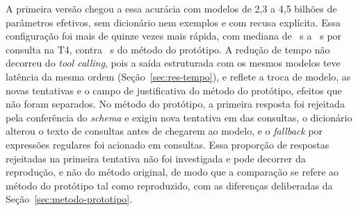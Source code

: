 A primeira versão chegou a essa acurácia com modelos de 2,3 a 4,5 bilhões de parâmetros efetivos, sem dicionário nem exemplos e com recusa explícita. Essa configuração foi mais de quinze vezes mais rápida, com mediana de ~s a ~s por consulta na T4, contra ~s do método do protótipo. A redução de tempo não decorreu do \textit{tool calling}, pois a saída estruturada com os mesmos modelos teve latência da mesma ordem (Seção~\ref{sec:res-tempo}), e reflete a troca de modelo, as novas tentativas e o campo de justificativa do método do protótipo, efeitos que não foram separados. No método do protótipo, a primeira resposta foi rejeitada pela conferência do \textit{schema} e exigiu nova tentativa em  das  consultas, o dicionário alterou o texto de  consultas antes de chegarem ao modelo, e o \textit{fallback} por expressões regulares foi acionado em  consultas. Essa proporção de respostas rejeitadas na primeira tentativa não foi investigada e pode decorrer da reprodução, e não do método original, de modo que a comparação se refere ao método do protótipo tal como reproduzido, com as diferenças deliberadas da Seção~\ref{sec:metodo-prototipo}.

